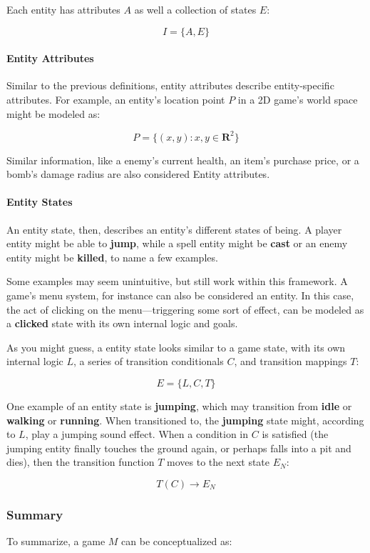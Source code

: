 \documentclass{report}
\begin{document}
Each entity has attributes $A$ as well a collection of states $E$:

$$I = \{A, E\}$$

\paragraph{Entity Attributes}
Similar to the previous definitions, entity attributes describe entity-specific attributes. For example, an entity's location point $P$ in a 2D game's world space might be modeled as:

$$P = \{(x,y): x,y \in \mathbf{R} ^2\}$$ 

Similar information, like a enemy's current health, an item's purchase price, or a bomb's damage radius are also considered Entity attributes. 

\paragraph{Entity States}
An entity state, then, describes an entity's different states of being. A player entity might be able to \textbf{jump}, while a spell entity might be \textbf{cast} or an enemy entity might be \textbf{killed}, to name a few examples. 

Some examples may seem unintuitive, but still work within this framework. A game's menu system, for instance can also be considered an entity. In this case, the act of clicking on the menu---triggering some sort of effect, can be modeled as a \textbf{clicked} state with its own internal logic and goals. 

As you might guess, a entity state looks similar to a game state, with its own internal logic $L$, a series of transition conditionals $C$, and transition mappings $T$:

$$E = \{L, C, T\}$$

One example of an entity state is \textbf{jumping}, which may transition from \textbf{idle} or \textbf{walking} or \textbf{running}. When transitioned to, the \textbf{jumping} state might, according to $L$, play a jumping sound effect. When a condition in $C$ is satisfied (the jumping entity finally touches the ground again, or perhaps falls into a pit and dies), then the transition function $T$ moves to the next state $E_N$:

$$T(C) \longrightarrow E_N$$

\subsubsection{Summary}
To summarize, a game $M$ can be conceptualized as:
\end{document}
